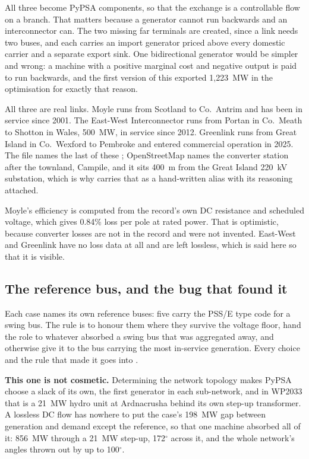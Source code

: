 \documentclass[11pt,a4paper]{article}
\begin{document}
All three become PyPSA  components, so that the exchange is a
controllable flow on a branch. That matters because a generator cannot run
backwards and an interconnector can. The two missing far
terminals are created, since a link needs two buses, and each carries an import
generator priced above every domestic carrier and a separate export sink. One
bidirectional generator would be simpler and wrong: a machine with a positive
marginal cost and negative output is paid to run backwards, and the first
version of this exported 1{,}223~MW in the optimisation for exactly that
reason.

All three are real links. Moyle runs from Scotland to Co.\ Antrim and has been
in service since 2001. The East-West Interconnector runs from Portan in
Co.\ Meath to Shotton in Wales, 500~MW, in service since 2012. Greenlink runs
from Great Island in Co.\ Wexford to Pembroke and entered commercial operation
in 2025. The file names the last of these
; OpenStreetMap names the converter station after the townland,
Campile, and it sits 400~m from the Great Island 220~kV substation, which is
why  carries that as a hand-written alias with its reasoning
attached.

Moyle's efficiency is computed from the record's own DC resistance and
scheduled voltage, which gives 0.84\% loss per pole at rated power. That is
optimistic, because converter losses are not in the record and were not
invented. East-West and Greenlink have no loss data at all and are left
lossless, which is said here so that it is visible.


\subsection{The reference bus, and the bug that found it}
\label{sec:slack}

Each case names its own reference buses: five carry the PSS/E type code for a
swing bus. The rule is to honour them where they survive the voltage floor,
hand the role to whatever absorbed a swing bus that was aggregated away, and
otherwise give it to the bus carrying the most in-service generation. Every
choice and the rule that made it goes into .

\textbf{This one is not cosmetic.} Determining the network topology makes PyPSA
choose a slack of its own, the first generator in each sub-network, and in
WP2033 that is a 21~MW hydro unit at Ardnacrusha behind its own step-up
transformer. A lossless DC flow has nowhere to put the case's 198~MW gap
between generation and demand except the reference, so that one machine
absorbed all of it: 856~MW through a 21~MW step-up, 172$^\circ$ across it, and
the whole network's angles thrown out by up to 100$^\circ$.
\end{document}
